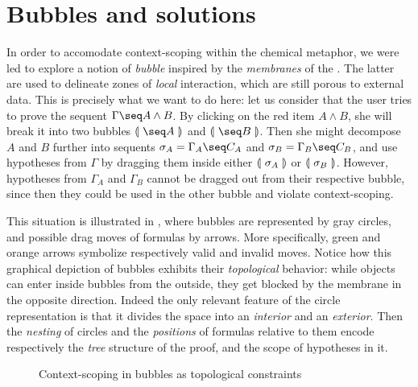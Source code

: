 \section{Bubbles and solutions}

In order to accomodate context-scoping within the chemical metaphor, we were led
to explore a notion of \emph{bubble} inspired by the \emph{membranes} of the
{\cham} . The latter are used to delineate zones
of \emph{local} interaction, which are still porous to external data. This is
precisely what we want to do here: let us consider that the user tries to prove
the sequent $\Gamma \seq A \land B$. By clicking on the red item $A \land B$,
she will break it into two bubbles $\bubbleT{\seq A}$ and $\bubbleT{\seq B}$.
Then she might decompose $A$ and $B$ further into sequents $\sigma_A = \Gamma_A
\seq C_A$ and $\sigma_B = \Gamma_B \seq C_B$, and use hypotheses from $\Gamma$
by dragging them inside either $\llparenthesis~\sigma_A~\rrparenthesis$ or $\llparenthesis~\sigma_B~\rrparenthesis$.
However, hypotheses from $\Gamma_A$ and $\Gamma_B$ cannot be dragged out from
their respective bubble, since then they could be used in the other bubble and
violate context-scoping.

This situation is illustrated in , where bubbles are
represented by gray circles, and possible drag moves of formulas by arrows. More
specifically, green and orange arrows symbolize respectively valid and invalid
moves. Notice how this graphical depiction of bubbles exhibits their
\emph{topological} behavior: while objects can enter inside bubbles from the
outside, they get blocked by the membrane in the opposite direction. Indeed the
only relevant feature of the circle representation is that it divides the space
into an \emph{interior} and an \emph{exterior}. Then the \emph{nesting} of
circles and the \emph{positions} of formulas relative to them encode
respectively the \emph{tree} structure of the proof, and the scope of hypotheses
in it.

\begin{figure}
\caption{Context-scoping in bubbles as topological constraints}
\end{figure}

